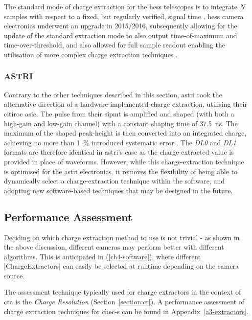 The standard mode of charge extraction for the \gls{hess} telescopes is to integrate $N$ samples with respect to a fixed, but regularly verified, signal time \cite{Aharonian2004}. \gls{hess} camera electronics underwent an upgrade in 2015/2016, subsequently allowing for the update of the standard extraction mode to also output time-of-maximum and time-over-threshold, and also allowed for full sample readout enabling the utilisation of more complex charge extraction techniques \cite{Klepser2017}\cite{Chalme-Calvet2015}.

\subsubsection{ASTRI}

Contrary to the other techniques described in this section, \gls{astri} took the alternative direction of a hardware-implemented charge extraction, utilising their \gls{citiroc} \gls{asic}. The pulse from their \gls{sipmt} is amplified and shaped (with both a high-gain and low-gain channel) with a constant shaping time of \SI{37.5}{ns}. The maximum of the shaped peak-height is then converted into an integrated charge, achieving no more than \SI{1}{\percent} introduced systematic error \cite{Impiombato2017}. The \textit{DL0} and \textit{DL1} formats are therefore identical in \gls{astri}'s case as the charge-extracted value is provided in place of waveforms. However, while this charge-extraction technique is optimised for the \gls{astri} electronics, it removes the flexibility of being able to dynamically select a charge-extraction technique within the software, and adopting new software-based techniques that may be designed in the future.

\subsection{Performance Assessment}

Deciding on which charge extraction method to use is not trivial - as shown in the above discussion, different cameras may perform better with different algorithms. This is anticipated in  (\ref{ch4-software}), where different |ChargeExtractors| can easily be selected at runtime depending on the camera source.

The assessment technique typically used for charge extractors in the context of \gls{cta} is the \textit{Charge Resolution} (Section~\ref{section:cr}). A performance assessment of charge extraction techniques for \gls{chec-s} can be found in Appendix~\ref{a3-extractors}.

